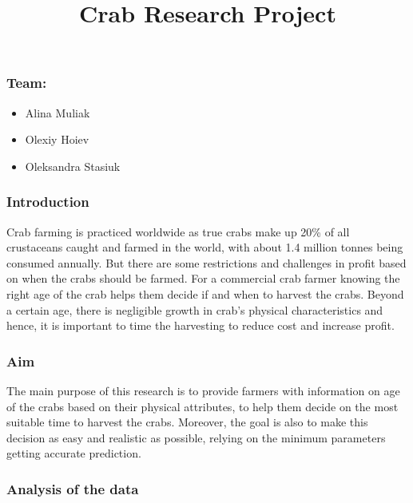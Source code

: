 \documentclass[
]{article}
\title{Crab Research Project}
\author{}
\date{\vspace{-2.5em}}
\providecommand{\tightlist}{%
  \setlength{\itemsep}{0pt}\setlength{\parskip}{0pt}}
\begin{document}
\maketitle

\hypertarget{team}{%
\subsubsection{Team:}\label{team}}

\begin{itemize}
\tightlist
\item
  Alina Muliak
\item
  Olexiy Hoiev
\item
  Oleksandra Stasiuk
\end{itemize}

\hypertarget{introduction}{%
\subsubsection{Introduction}\label{introduction}}

Crab farming is practiced worldwide as true crabs make up 20\% of all
crustaceans caught and farmed in the world, with about 1.4 million
tonnes being consumed annually. But there are some restrictions and
challenges in profit based on when the crabs should be farmed. For a
commercial crab farmer knowing the right age of the crab helps them
decide if and when to harvest the crabs. Beyond a certain age, there is
negligible growth in crab's physical characteristics and hence, it is
important to time the harvesting to reduce cost and increase profit.

\hypertarget{aim}{%
\subsubsection{Aim}\label{aim}}

The main purpose of this research is to provide farmers with information
on age of the crabs based on their physical attributes, to help them
decide on the most suitable time to harvest the crabs. Moreover, the
goal is also to make this decision as easy and realistic as possible,
relying on the minimum parameters getting accurate prediction.

\hypertarget{analysis-of-the-data}{%
\subsubsection{Analysis of the data}\label{analysis-of-the-data}}
\end{document}
